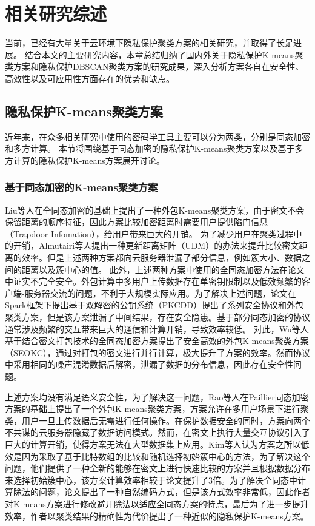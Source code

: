 \chapter{相关研究综述}
当前，已经有大量关于云环境下隐私保护聚类方案的相关研究，并取得了长足进展。
结合本文的主要研究内容，本章总结归纳了国内外关于隐私保护K-means聚类方案和隐私保护DBSCAN聚类方案的研究成果，深入分析方案各自在安全性、高效性以及可应用性方面存在的优势和缺点。

\section{隐私保护K-means聚类方案}
近年来，在众多相关研究中使用的密码学工具主要可以分为两类，分别是同态加密和多方计算。
本节将围绕基于同态加密的隐私保护K-means聚类方案以及基于多方计算的隐私保护K-means方案展开讨论。

\subsection{基于同态加密的K-means聚类方案}
Liu等人\cite{liu2014privacy}在全同态加密的基础上提出了一种外包K-means聚类方案，由于密文不会保留距离的顺序特征，因此方案比较加密距离时需要用户提供陷门信息（Trapdoor Infomation），给用户带来巨大的开销。 
为了减少用户在聚类过程中的开销，Almutairi等人\cite{almutairi2017k}提出一种更新距离矩阵（UDM）的办法来提升比较密文距离的效率。但是上述两种方案都向云服务器泄漏了部分信息，例如簇大小、数据之间的距离以及簇中心的值。
此外，上述两种方案中使用的全同态加密方法在论文\cite{wang2015notes}中证实不完全安全。外包计算中多用户上传数据存在单密钥限制以及低效频繁的客户端-服务器交流的问题，不利于大规模实际应用。为了解决上述问题，论文\cite{rong2017privacy}在Spark框架下提出基于双解密的公钥系统（PKCDD）提出了系列安全协议和外包聚类方案，但是该方案泄漏了中间结果，存在安全隐患。基于部分同态加密的协议通常涉及频繁的交互带来巨大的通信和计算开销，导致效率较低。
对此，Wu等人\cite{wu2020secure}基于结合密文打包技术的全同态加密方案提出了安全高效的外包K-means聚类方案（SEOKC），通过对打包的密文进行并行计算，极大提升了方案的效率。然而协议中采用相同的噪声混淆数据后解密，泄漏了数据的分布信息，因此存在安全性问题。

上述方案均没有满足语义安全性，为了解决这一问题，Rao等人\cite{rao2015privacy}在Paillier同态加密方案的基础上提出了一个外包K-means聚类方案，方案允许在多用户场景下进行聚类，用户一旦上传数据后无需进行任何操作。在保护数据安全的同时，方案向两个不共谋的云服务器隐藏了数据访问模式。然而，在密文上执行大量交互协议引入了巨大的计算开销，使得方案无法在大型数据集上应用。Kim等人\cite{kim2018privacy}认为方案\cite{rao2015privacy}之所以低效是因为采取了基于比特数组的比较和随机选择初始簇中心的方法，为了解决这个问题，他们提供了一种全新的能够在密文上进行快速比较的方案并且根据数据分布来选择初始簇中心，该方案计算效率相较于论文\cite{rao2015privacy}提升了3倍。为了解决全同态中计算除法的问题，论文\cite{jaschke2019unsupervised}提出了一种自然编码方式，但是该方式效率非常低，因此作者对K-means方案进行修改避开除法以适应全同态方案的特点，最后为了进一步提升效率，作者以聚类结果的精确性为代价提出了一种近似的隐私保护K-means方案。

